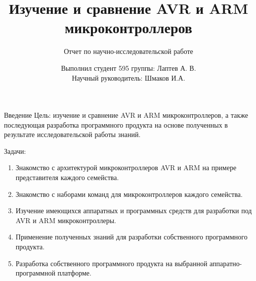 \documentclass[12pt,a4paper,mathserif]{beamer}
\author[Лаптев А.В.]{{Выполнил студент 595 группы: Лаптев А. В.}\\
{Научный руководитель: Шмаков И.А.}}
\title[Научно-исследовательская работа]{Изучение и сравнение AVR и ARM микроконтроллеров}
\subtitle{Отчет по научно-исследовательской работе}
\begin{document}
\begin{frame}
\maketitle
\end{frame}

\begin{frame}{Введение}
    \setlength{\parindent}{0.5cm}
    Цель: изучение и сравнение AVR и ARM микроконтроллеров, а также последующая разработка программного продукта на основе полученных в результате исследовательской работы знаний.
    
    Задачи:
    \begin{enumerate}
        \item Знакомство с архитектурой микроконтроллеров AVR и ARM на примере представителя каждого семейства.
        
        \item Знакомство с наборами команд для микроконтроллеров каждого семейства.
        
        \item Изучение имеющихся аппаратных и программных средств для разработки под AVR и ARM микроконтроллеры.
        
        \item Применение полученных знаний для разработки собственного программного продукта.
        
        \item Разработка собственного программного продукта на выбранной аппаратно-программной платформе.
    \end{enumerate}
\end{frame}
\end{document}
